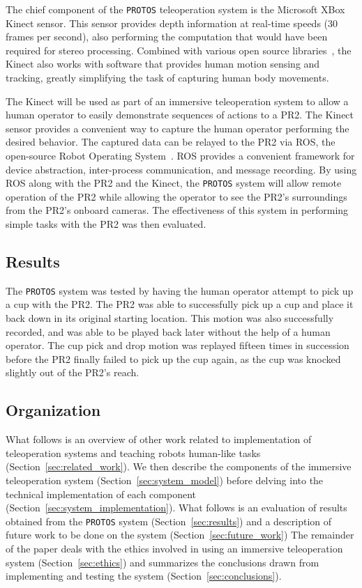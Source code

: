 \documentclass{sig-alternate}
\begin{document}
\indent The chief component of the {\tt PROTOS} teleoperation system is the Microsoft XBox Kinect sensor. This sensor provides depth information at real-time speeds
(30 frames per second), also performing the computation that would have been required for stereo 
processing. Combined with various open source libraries~\cite{kinect}, the Kinect also works with 
software that provides human motion sensing and tracking, greatly simplifying the task of capturing human body movements.

\indent The Kinect will be used as part of an immersive teleoperation system to allow a human operator to easily demonstrate sequences of actions
to a PR2.
The Kinect sensor provides a convenient way to capture the human operator performing the desired behavior. The captured data can be relayed to the
PR2 via ROS, the open-source Robot Operating System~\cite{ros}. ROS provides a 
convenient framework for device abstraction, inter-process communication, and message recording.
By using ROS along with the PR2 and the Kinect, the {\tt PROTOS} system will allow remote operation of the PR2 while
allowing the operator to see the PR2's surroundings from the PR2's onboard cameras. The effectiveness of this system in performing simple tasks with the PR2 
was then evaluated.

\subsection{Results}
\indent The {\tt PROTOS} system was tested by having the human operator attempt to pick up a cup with the PR2. The PR2 was able to successfully pick up a cup and 
place it back down in its original starting location. This motion was also successfully recorded, and was able to be played back later without the help of a human operator.
The cup pick and drop motion was replayed fifteen times in succession before the PR2 finally failed to pick up the cup again, as the cup was knocked slightly out of
the PR2's reach.

\subsection{Organization}
\indent What follows is an overview of other work related to implementation of 
teleoperation systems and teaching robots human-like tasks (Section~\ref{sec:related_work}). We then describe 
the components of the immersive teleoperation system (Section~\ref{sec:system_model}) before delving 
into the technical implementation of each component (Section~\ref{sec:system_implementation}). What follows is an 
evaluation of results obtained from the {\tt PROTOS} system (Section~\ref{sec:results}) and a description of future work to be
done on the system (Section~\ref{sec:future_work}) The remainder of the paper deals with the ethics involved in using an immersive teleoperation
system (Section~\ref{sec:ethics}) and summarizes the conclusions drawn from implementing and testing the system (Section~\ref{sec:conclusions}).
\end{document}
